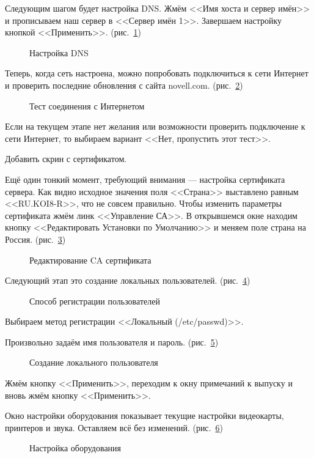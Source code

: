 Следующим шагом будет настройка DNS. Жмём <<Имя хоста и сервер имён>> и прописываем наш сервер в <<Сервер имён 1>>. Завершаем настройку кнопкой <<Применить>>. (рис.~\ref{fig9})
\begin{figure}[H]
\caption{Настройка DNS}
\label{fig9}
\end{figure}
\clearpage

Теперь, когда сеть настроена, можно попробовать подключиться к сети Интернет и проверить последние обновления с сайта novell.com. (рис.~\ref{fig10})
\begin{figure}[H]
\caption{Тест соединения с Интернетом}
\label{fig10}
\end{figure}
Если на текущем этапе нет желания или возможности проверить подключение к сети Интернет, то выбираем вариант <<Нет, пропустить этот тест>>.
\clearpage

Добавить скрин с сертификатом.
\clearpage

Ещё один тонкий момент, требующий внимания — настройка сертификата сервера. Как видно исходное значения поля <<Страна>> выставлено равным <<RU.KOI8-R>>, что не совсем правильно. Чтобы изменить параметры сертификата жмём линк <<Управление СА>>. В открывшемся окне находим кнопку <<Редактировать Установки по Умолчанию>> и меняем поле страна на Россия. (рис.~\ref{fig11})
\begin{figure}[H]
\caption{Редактирование CA сертификата}
\label{fig11}
\end{figure}
\clearpage

Следующий этап это создание локальных пользователей. (рис.~\ref{fig12})
\begin{figure}[H]
\caption{Способ регистрации пользователей}
\label{fig12}
\end{figure}
Выбираем метод регистрации <<Локальный (/etc/passwd)>>.
\clearpage

Произвольно задаём имя пользователя и пароль. (рис.~\ref{fig13})
\begin{figure}[H]
\caption{Создание локального пользователя}
\label{fig13}
\end{figure}
Жмём кнопку <<Применить>>, переходим к окну примечаний к выпуску и вновь жмём кнопку <<Применить>>.
\clearpage

Окно настройки оборудования показывает текущие настройки видеокарты, принтеров и звука. Оставляем всё без изменений. (рис.~\ref{fig14})
\begin{figure}[H]
\caption{Настройка оборудования}
\label{fig14}
\end{figure}
\clearpage

